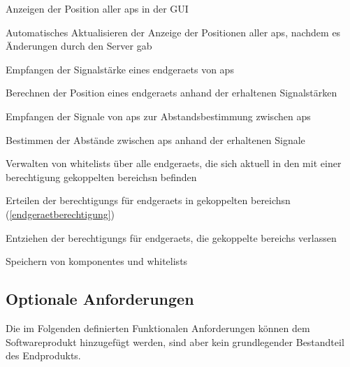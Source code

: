 \begin{sfalist}
	\item \label{faapanzeigen} Anzeigen der Position aller \glspl{ap} in der GUI
	\item \label{faapaktualisieren} Automatisches Aktualisieren der Anzeige der Positionen aller \glspl{ap}, nachdem es Änderungen durch den Server gab
	\item \label{fadatenempfangen} Empfangen der Signalstärke eines \gls{endgeraet}s von \glspl{ap}
	\item \label{fapositionberechnen} Berechnen der Position eines \gls{endgeraet}s anhand der erhaltenen Signalstärken
	\item \label{faserversignalempfangen} Empfangen der Signale von \glspl{ap} zur Abstandsbestimmung zwischen \glspl{ap}
	\item \label{faapabstaendebestimmen} Bestimmen der Abstände zwischen \glspl{ap} anhand der erhaltenen Signale
	\item \label{fawhitelistmanagen} Verwalten von \glspl{whitelist} über alle \glspl{endgeraet}, die sich aktuell in den mit einer \gls{berechtigung} gekoppelten \glspl{bereich}n befinden
	\begin{sfalist}
		\item \label{faberechtigungenbereitstellen} Erteilen der \glspl{berechtigung} für \glspl{endgeraet} in gekoppelten \glspl{bereich}n (\ref{endgeraetberechtigung})
		\item \label{faberechtigungentziehen} Entziehen der \glspl{berechtigung} für \glspl{endgeraet}, die gekoppelte \glspl{bereich} verlassen	
	\end{sfalist}
	\item \label{fakomponentenspeichern} Speichern von \glspl{komponente} und \glspl{whitelist}
\end{sfalist}

\subsection{Optionale Anforderungen}
Die im Folgenden definierten Funktionalen Anforderungen können dem Softwareprodukt hinzugefügt werden, sind aber kein grundlegender Bestandteil des Endprodukts.


